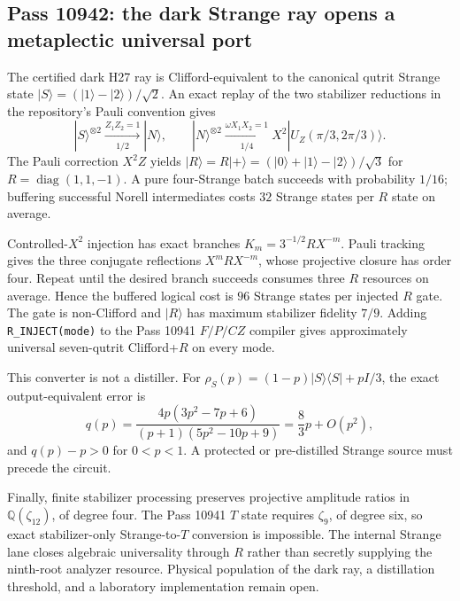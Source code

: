 \subsection{Pass 10942: the dark Strange ray opens a metaplectic universal port}

The certified dark H27 ray is Clifford-equivalent to the canonical qutrit
Strange state $|S\rangle=(|1\rangle-|2\rangle)/\sqrt2$.  An exact replay of
the two stabilizer reductions in the repository's Pauli convention gives
\[
 |S\rangle^{\otimes2}\xrightarrow[1/2]{Z_1Z_2=1}|N\rangle,
 \qquad
 |N\rangle^{\otimes2}\xrightarrow[1/4]{\omega X_1X_2=1}
 X^2|U_Z(\pi/3,2\pi/3)\rangle.
\]
The Pauli correction $X^2Z$ yields
$|R\rangle=R|+\rangle=(|0\rangle+|1\rangle-|2\rangle)/\sqrt3$ for
$R=\operatorname{diag}(1,1,-1)$.  A pure four-Strange batch succeeds with
probability $1/16$; buffering successful Norell intermediates costs $32$
Strange states per $R$ state on average.

Controlled-$X^2$ injection has exact branches
$K_m=3^{-1/2}RX^{-m}$.  Pauli tracking gives the three conjugate reflections
$X^mRX^{-m}$, whose projective closure has order four.  Repeat until the
desired branch succeeds consumes three $R$ resources on average.  Hence the
buffered logical cost is $96$ Strange states per injected $R$ gate.  The gate
is non-Clifford and $|R\rangle$ has maximum stabilizer fidelity $7/9$.
Adding \texttt{R\_INJECT(mode)} to the Pass 10941 $F/P/CZ$ compiler gives
approximately universal seven-qutrit Clifford+$R$ on every mode.

This converter is not a distiller.  For
$\rho_S(p)=(1-p)|S\rangle\!\langle S|+pI/3$, the exact output-equivalent error is
\[
 q(p)=\frac{4p(3p^2-7p+6)}{(p+1)(5p^2-10p+9)}
     =\frac83p+O(p^2),
\]
and $q(p)-p>0$ for $0<p<1$.  A protected or pre-distilled Strange source must
precede the circuit.

Finally, finite stabilizer processing preserves projective amplitude ratios in
$\mathbb Q(\zeta_{12})$, of degree four.  The Pass 10941 $T$ state requires
$\zeta_9$, of degree six, so exact stabilizer-only Strange-to-$T$ conversion is
impossible.  The internal Strange lane closes algebraic universality through
$R$ rather than secretly supplying the ninth-root analyzer resource.  Physical
population of the dark ray, a distillation threshold, and a laboratory
implementation remain open.
